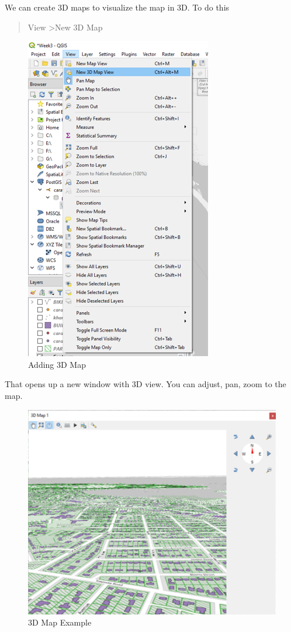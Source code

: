 \documentclass[
]{book}
\begin{document}
We can create 3D maps to visualize the map in 3D. To do this

\begin{quote}
View \textgreater New 3D Map
\end{quote}

\begin{figure}
\centering
\includegraphics{Images/New3Dmap.png}
\caption{Adding 3D Map}
\end{figure}

That opens up a new window with 3D view. You can adjust, pan, zoom to the map.

\begin{figure}
\centering
\includegraphics{Images/3Dmap.png}
\caption{3D Map Example}
\end{figure}
\end{document}
